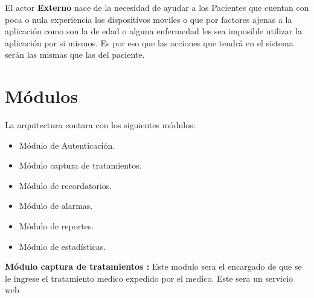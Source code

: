 El actor \textbf{Externo} nace de la necesidad de ayudar a los Pacientes que cuentan con poca o nula experiencia los dispositivos moviles o que por factores ajenas a la aplicación como son la de edad o alguna enfermedad les sea imposible utilizar la aplicación por si mismos. Es por eso que las acciones que tendrá en el sistema serán las mismas que las del paciente.

\section{Módulos}
La arquitectura contara con los siguientes módulos:
\begin{itemize}
	\item Módulo de Autenticación.
	\item Módulo captura de tratamientos.
	\item Módulo de recordatorios.
	\item Módulo de alarmas.
	\item Módulo de reportes.
	\item Módulo de estadísticas.
\end{itemize}

\textbf{Módulo captura de tratamientos :} Este modulo sera el encargado de que se le ingrese el tratamiento medico expedido por el medico. Este sera un servicio web 